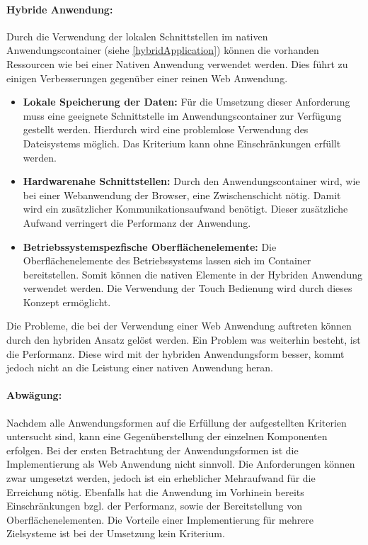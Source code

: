 \paragraph{Hybride Anwendung: }Durch die Verwendung der lokalen Schnittstellen im nativen Anwendungscontainer (siehe \ref{hybridApplication}) können die vorhanden Ressourcen wie bei einer Nativen Anwendung verwendet werden. Dies führt zu einigen Verbesserungen gegenüber einer reinen Web Anwendung.

\begin{itemize}
 \item \textbf{Lokale Speicherung der Daten:} Für die Umsetzung dieser Anforderung muss eine geeignete Schnittstelle im Anwendungscontainer zur Verfügung gestellt werden. Hierdurch wird eine problemlose Verwendung des Dateisystems möglich. Das Kriterium kann ohne Einschränkungen erfüllt werden. 
 
 \item \textbf{Hardwarenahe Schnittstellen:} Durch den Anwendungscontainer wird, wie bei einer Webanwendung der Browser, eine Zwischenschicht nötig. Damit wird ein zusätzlicher Kommunikationsaufwand benötigt. Dieser zusätzliche Aufwand verringert die Performanz der Anwendung.
 
 \item \textbf{Betriebssystemspezfische Oberflächenelemente:} Die Oberflächenelemente des Betriebssystems lassen sich im Container bereitstellen. Somit können die nativen Elemente in der Hybriden Anwendung verwendet werden. Die Verwendung der Touch Bedienung wird durch dieses Konzept ermöglicht.
 \end{itemize}
 Die Probleme, die bei der Verwendung einer Web Anwendung auftreten können durch den hybriden Ansatz gelöst werden. Ein Problem was weiterhin besteht, ist die Performanz. Diese wird mit der hybriden Anwendungsform besser, kommt jedoch nicht an die Leistung einer nativen Anwendung heran.

\paragraph{Abwägung: }
Nachdem alle Anwendungsformen auf die Erfüllung der aufgestellten Kriterien untersucht sind, kann eine Gegenüberstellung der einzelnen Komponenten erfolgen.  Bei der ersten Betrachtung der Anwendungsformen ist die Implementierung als Web Anwendung nicht sinnvoll. Die Anforderungen können zwar umgesetzt werden, jedoch ist ein erheblicher Mehraufwand für die Erreichung nötig. Ebenfalls hat die Anwendung im Vorhinein bereits Einschränkungen bzgl. der Performanz, sowie der Bereitstellung von Oberflächenelementen. Die Vorteile einer Implementierung für mehrere Zielsysteme ist bei der Umsetzung kein Kriterium. \par

